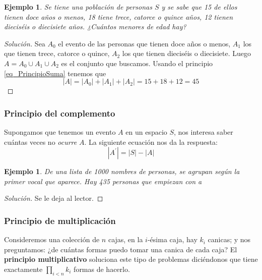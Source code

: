 \documentclass[spanish]{report}
\newtheorem{ejm}[thm]{Ejemplo}
\newcommand{\card}[1]{\left|#1 \right|}
\begin{document}
\begin{ejm}
	Se tiene una población de personas $S$ y se sabe que 15 de ellos tienen doce años o menos, 18 tiene trece, catorce o quince años, 12 tienen dieciséis o diecisiete años. ¿Cuántos menores de edad hay?
\end{ejm}
\begin{proof}[Solución]
	Sea $A_0$ el evento de las personas que tienen doce años o menos, $A_1$ los que tienen trece, catorce o quince, $A_2$ los que tienen dieciséis o diecisiete.
	Luego $A = A_0 \cup A_1 \cup A_2$ es el conjunto que buscamos. Usando el principio \ref{eq_PrincipioSuma} tenemos que \[\card{A} = \card{A_0}+\card{A_1}+\card{A_2} = 15+18+12= 45\]
\end{proof}

\subsubsection{Principio del complemento} %

Supongamos que tenemos un evento $A$ en un espacio $S$, nos interesa saber cuántas veces no \emph{ocurre} $A$. La siguiente ecuación nos da la respuesta:
\begin{equation}\label{eq_PrincipioComplemento}
	\card{A^\prime} = \card{S} - \card{A}
\end{equation}

\begin{ejm}
	De una lista de 1000 nombres de personas, se agrupan según la primer vocal que aparece. Hay 435 personas que empiezan con \emph{a} %
\end{ejm}
\begin{proof}[Solución]
	Se le deja al lector. %
\end{proof}

\subsubsection{Principio de multiplicación}
Consideremos una colección de $n$ cajas, en la $i$-ésima caja, hay $k_i$ canicas; y nos preguntamos: ¿de cuántas formas puedo tomar una canica de cada caja?
El \textbf{principio multiplicativo} soluciona este tipo de problemas diciéndonos que tiene exactamente $\prod_{i<n}k_i$ formas de hacerlo.
\end{document}
